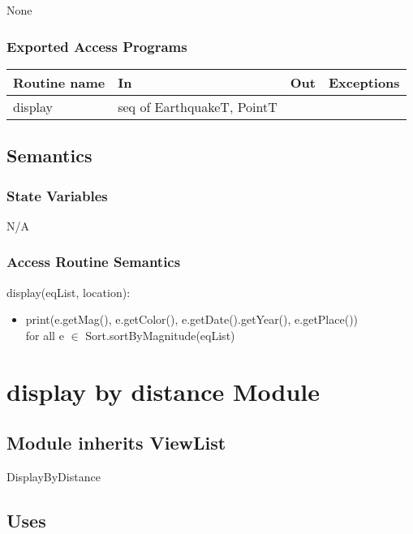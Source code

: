\documentclass[12pt]{article}
\begin{document}
None

\subsubsection* {Exported Access Programs}

\begin{tabular}{| l | l | l | l |}
\hline
\textbf{Routine name} & \textbf{In} & \textbf{Out} & \textbf{Exceptions}\\
\hline
display & seq of EarthquakeT, PointT & ~ &  ~\\
\hline
\end{tabular}

\subsection* {Semantics}

\subsubsection* {State Variables}

N/A


\subsubsection* {Access Routine Semantics}

\noindent display(eqList, location):
\begin{itemize}
\item print(e.getMag(), e.getColor(), e.getDate().getYear(), e.getPlace())\\  
for all e $\in$ Sort.sortByMagnitude(eqList)
\end{itemize}





\newpage

\section* {display by distance Module}

\subsection* {Module inherits ViewList}

DisplayByDistance

\subsection* {Uses}
\end{document}
